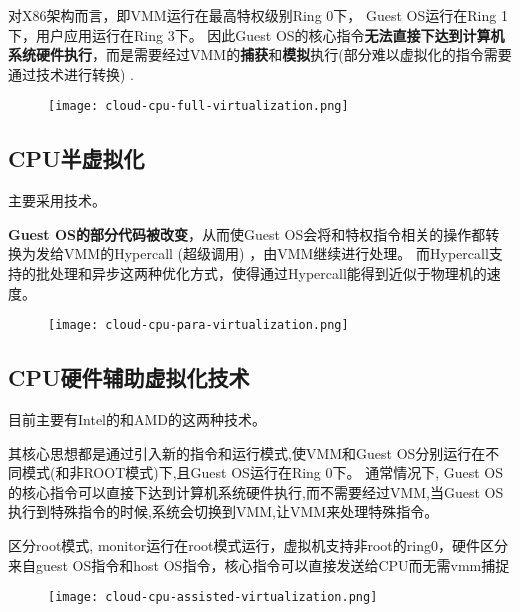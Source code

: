 对X86架构而言，即VMM运行在最高特权级别Ring 0下， Guest OS运行在Ring 1下，用户应用运行在Ring 3下。 因此Guest OS的核心指令\textbf{无法直接下达到计算机系统硬件执行}，而是需要经过VMM的\textbf{捕获}和\textbf{模拟}执行(部分难以虚拟化的指令需要通过技术进行转换) . 

\begin{figure}[htbp]
    \begin{center}
        \texttt{[image: cloud-cpu-full-virtualization.png]}
    \end{center}
\end{figure}

\subsection{CPU半虚拟化}
    
主要采用技术。 

\textbf{Guest OS的部分代码被改变}，从而使Guest OS会将和特权指令相关的操作都转换为发给VMM的Hypercall (超级调用) ，由VMM继续进行处理。 而Hypercall支持的批处理和异步这两种优化方式，使得通过Hypercall能得到近似于物理机的速度。 

\begin{figure}[htbp]
    \begin{center}
        \texttt{[image: cloud-cpu-para-virtualization.png]}
    \end{center}
\end{figure}

\subsection{CPU硬件辅助虚拟化技术}

目前主要有Intel的和AMD的这两种技术。 

其核心思想都是通过引入新的指令和运行模式,使VMM和Guest OS分别运行在不同模式(和非ROOT模式)下,且Guest OS运行在Ring 0下。 通常情况下, Guest OS的核心指令可以直接下达到计算机系统硬件执行,而不需要经过VMM,当Guest OS执行到特殊指令的时候,系统会切换到VMM,让VMM来处理特殊指令。 

区分root模式, monitor运行在root模式运行，虚拟机支持非root的ring0，硬件区分来自guest OS指令和host OS指令，核心指令可以直接发送给CPU而无需vmm捕捉

\begin{figure}[htbp]
    \begin{center}
        \texttt{[image: cloud-cpu-assisted-virtualization.png]}
    \end{center}
\end{figure}

